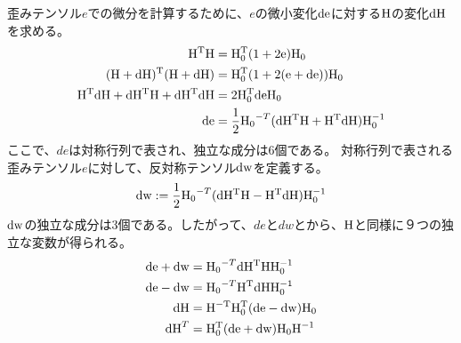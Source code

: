 \documentclass[11pt,a4paper,uplatex]{jsarticle}
\begin{document}
歪みテンソル$e$での微分を計算するために、$e$の微小変化${\rm de}$に対する${\rm H}$の変化${\rm dH}$を求める。
\begin{align}
    {\rm H^{T} H} &= {\rm H_{0}^{T}} ( 1 + 2 {\rm e}) {\rm H_{0} } \\
    {\rm (H + dH)^{T} (H+dH)} &= {\rm H_{0}^{T}} (1 + 2({\rm e+de })) {\rm H_{0} } \\
    {\rm H^{T} dH + dH^{T} H + dH^{T} dH } &= 2 {\rm H_{0}^{T} de H_{0} }\\
    {\rm de} &= \frac{1}{2} {\rm H_{0}}^{-T} ( {\rm dH^{T} H + H^{T} dH } ) {\rm H_{0}^{-1}}
\end{align}
ここで、$de$は対称行列で表され、独立な成分は6個である。
対称行列で表される歪みテンソル$e$に対して、反対称テンソル${\rm dw}$を定義する。
\begin{align}
    {\rm dw} &:= \frac{1}{2} {\rm H_{0}}^{-T} ( {\rm  dH^{T} H - H^{T} dH } ) {\rm H_{0}^{-1}} \\
\end{align}
${\rm dw}$の独立な成分は3個である。したがって、$de$と$dw$とから、${\rm H}$と同様に９つの独立な変数が得られる。
\begin{align}
    {\rm de + dw} &= {\rm H_{0}}^{-T} {\rm dH^{T} H  H_{0}^{-1} } \\
    {\rm de - dw} &= {\rm H_{0}}^{-T} {\rm H^{T} dH  H_{0}^{-1} } \\
    {\rm dH} &= {\rm H^{-T} H_{0}^{T}} ({\rm de - dw}) {\rm H_{0}} \\
    {\rm dH}^{T} &= {\rm H_{0}^{T}}({\rm de + dw}) {\rm H_{0}} {\rm H}^{-1}\\
\end{align}
\end{document}
